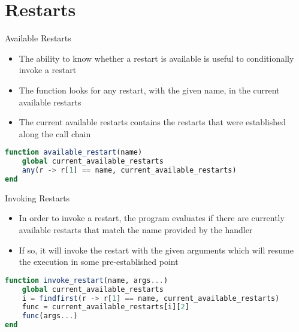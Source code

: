 \documentclass{beamer}
\begin{document}
\section{Restarts}
\begin{frame}[fragile,t]{Available Restarts}
\begin{itemize}
    \item The ability to know whether a restart is available is useful to conditionally invoke a restart
    \item The function looks for any restart, with the given name, in the current available restarts
    \item The current available restarts contains the restarts that were established along the call chain
\end{itemize}
\vfill
\begin{lstlisting}[language=julia, style=jlcodestyle]
function available_restart(name)
    global current_available_restarts
    any(r -> r[1] == name, current_available_restarts)
end
\end{lstlisting}
\end{frame}


\begin{frame}[fragile,t]{Invoking Restarts}

\begin{itemize}
    \item In order to invoke a restart, the program evaluates if there are currently available restarts that match the name provided by the handler
    \item If so, it will invoke the restart with the given arguments which will resume the execution in some pre-established point
\end{itemize}
\vfill
\begin{lstlisting}[language=julia, style=jlcodestyle]
function invoke_restart(name, args...)
    global current_available_restarts
    i = findfirst(r -> r[1] == name, current_available_restarts)
    func = current_available_restarts[i][2]
    func(args...)
end
\end{lstlisting}
\end{frame}

\end{document}
